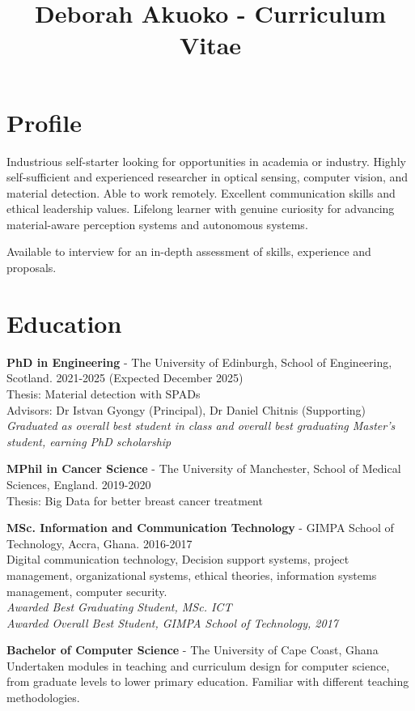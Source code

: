 \documentclass[11pt,a4paper]{article}
\title{Deborah Akuoko - Curriculum Vitae}
\author{}
\date{}
\begin{document}
\maketitle
\thispagestyle{empty}

\section*{Profile}
Industrious self-starter looking for opportunities in academia or industry. Highly self-sufficient and experienced researcher in optical sensing, computer vision, and material detection. Able to work remotely. Excellent communication skills and ethical leadership values. Lifelong learner with genuine curiosity for advancing material-aware perception systems and autonomous systems.

Available to interview for an in-depth assessment of skills, experience and proposals.

\section*{Education}
\textbf{PhD in Engineering} - The University of Edinburgh, School of Engineering, Scotland. 2021-2025 (Expected December 2025)\\
Thesis: Material detection with SPADs\\
Advisors: Dr Istvan Gyongy (Principal), Dr Daniel Chitnis (Supporting)\\
\textit{Graduated as overall best student in class and overall best graduating Master's student, earning PhD scholarship}

\textbf{MPhil in Cancer Science} - The University of Manchester, School of Medical Sciences, England. 2019-2020\\
Thesis: Big Data for better breast cancer treatment

\textbf{MSc. Information and Communication Technology} - GIMPA School of Technology, Accra, Ghana. 2016-2017\\
Digital communication technology, Decision support systems, project management, organizational systems, ethical theories, information systems management, computer security.\\
\textit{Awarded Best Graduating Student, MSc. ICT}\\
\textit{Awarded Overall Best Student, GIMPA School of Technology, 2017}

\textbf{Bachelor of Computer Science} - The University of Cape Coast, Ghana\\
Undertaken modules in teaching and curriculum design for computer science, from graduate levels to lower primary education. Familiar with different teaching methodologies.
\end{document}
